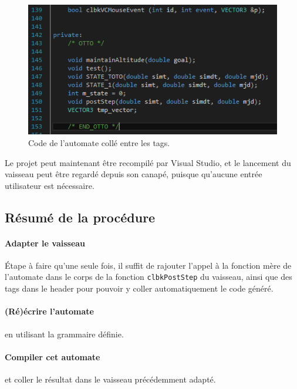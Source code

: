 \documentclass[a4paper,11pt]{article}
\begin{document}
        \begin{figure}[!h]
            \begin{center}
                \includegraphics{img/code_header.png}
                \caption{Code de l'automate collé entre les tags.}
            \end{center}
        \end{figure}
        
            Le projet peut maintenant être recompilé par Visual Studio, et le lancement du vaisseau peut être regardé depuis son canapé, puisque qu'aucune entrée utilisateur est nécessaire.
            
    \subsection{Résumé de la procédure}
        \paragraph{Adapter le vaisseau}
            \'Etape à faire qu'une seule fois, il suffit de rajouter l'appel à la fonction mère de l'automate dans le corps de la fonction \verb|clbkPostStep| du vaisseau, ainsi que des tags dans le header pour pouvoir y coller automatiquement le code généré.
            
        \paragraph{(Ré)écrire l'automate} en utilisant la grammaire définie.
        
        \paragraph{Compiler cet automate} et coller le résultat dans le vaisseau précédemment adapté.
        
\end{document}
